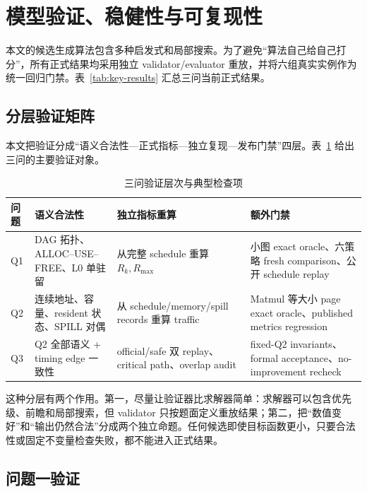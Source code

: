 \section{模型验证、稳健性与可复现性}

本文的候选生成算法包含多种启发式和局部搜索。为了避免“算法自己给自己打分”，所有正式结果均采用独立 validator/evaluator 重放，并将六组真实实例作为统一回归门禁。表~\ref{tab:key-results} 汇总三问当前正式结果。

\begin{table}[H]
    \centering
    \caption{六组实例的三问核心结果汇总}
    \label{tab:key-results}
    \resizebox{\textwidth}{!}{}
\end{table}

\subsection{分层验证矩阵}

本文把验证分成“语义合法性—正式指标—独立复现—发布门禁”四层。表~\ref{tab:validation-matrix} 给出三问的主要验证对象。

\begin{table}[H]
\centering
\caption{三问验证层次与典型检查项}
\label{tab:validation-matrix}
\begin{tabular}{p{1.4cm}p{4.0cm}p{5.2cm}p{3.0cm}}
\toprule
问题 & 语义合法性 & 独立指标重算 & 额外门禁 \\
\midrule
Q1 & DAG 拓扑、ALLOC--USE--FREE、L0 单驻留 & 从完整 schedule 重算 $R_k,R_{\max}$ & 小图 exact oracle、六策略 fresh comparison、公开 schedule replay \\
Q2 & 连续地址、容量、resident 状态、SPILL 对偶 & 从 schedule/memory/spill records 重算 traffic & Matmul 等大小 page exact oracle、published metrics regression \\
Q3 & Q2 全部语义 + timing edge 一致性 & official/safe 双 replay、critical path、overlap audit & fixed-Q2 invariants、formal acceptance、no-improvement recheck \\
\bottomrule
\end{tabular}
\end{table}

这种分层有两个作用。第一，尽量让验证器比求解器简单：求解器可以包含优先级、前瞻和局部搜索，但 validator 只按题面定义重放结果；第二，把“数值变好”和“输出仍然合法”分成两个独立命题。任何候选即使目标函数更小，只要合法性或固定不变量检查失败，都不能进入正式结果。

\subsection{问题一验证}

